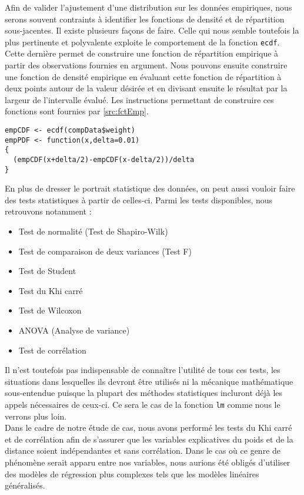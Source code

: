 Afin de valider l'ajustement d'une distribution sur les données empiriques, nous serons souvent contraints à identifier les fonctions de densité et de répartition sous-jacentes. Il existe plusieurs façons de faire. Celle qui nous semble toutefois la plus pertinente et polyvalente exploite le comportement de la fonction \texttt{ecdf}. Cette dernière permet de construire une fonction de répartition empirique à partir des observations fournies en argument. Nous pouvons ensuite construire une fonction de densité empirique en évaluant cette fonction de répartition à deux points autour de la valeur désirée et en divisant ensuite le résultat par la largeur de l'intervalle évalué. Les instructions permettant de construire ces fonctions sont fournies par \autoref{src:fctEmp}. \\

\begin{lstlisting}[caption = Fonctions de densité et de répartition empiriques,label=src:fctEmp]
empCDF <- ecdf(compData$weight)
empPDF <- function(x,delta=0.01)
{
  (empCDF(x+delta/2)-empCDF(x-delta/2))/delta
}
\end{lstlisting}

\vspace{\baselineskip}
En plus de dresser le portrait statistique des données, on peut aussi vouloir faire des tests statistiques à partir de celles-ci. Parmi les tests disponibles, nous retrouvons notamment :
\begin{itemize}
	\item Test de normalité (Test de Shapiro-Wilk)
	\item Test de comparaison de deux variances (Test F)
	\item Test de Student
	\item Test du Khi carré
	\item Test de Wilcoxon
	\item ANOVA (Analyse de variance)
	\item Test de corrélation
\end{itemize}
Il n'est toutefois pas indispensable de connaître l'utilité de tous ces tests, les situations dans lesquelles ils devront être utilisés ni la mécanique mathématique sous-entendue puisque la plupart des méthodes statistiques incluront déjà les appels nécessaires de ceux-ci. Ce sera le cas de la fonction \texttt{lm} comme nous le verrons plus loin. \cite{testStatsR} \\

Dans le cadre de notre étude de cas, nous avons performé les tests du Khi carré et de corrélation afin de s'assurer que les variables explicatives du poids et de la distance soient indépendantes et sans corrélation. Dans le cas où ce genre de phénomène serait apparu entre nos variables, nous aurions été obligés d'utiliser des modèles de régression plus complexes tels que les modèles linéaires généralisés. \\

